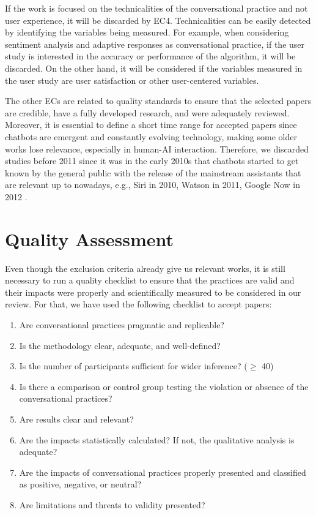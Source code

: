If the work is focused on the technicalities of the conversational practice and not user experience, it will be discarded by EC4. Technicalities can be easily detected by identifying the variables being measured. For example, when considering sentiment analysis and adaptive responses as conversational practice, if the user study is interested in the accuracy or performance of the algorithm, it will be discarded. On the other hand, it will be considered if the variables measured in the user study are user satisfaction or other user-centered variables.

The other ECs are related to quality standards to ensure that the selected papers are credible, have a fully developed research, and were adequately reviewed. Moreover, it is essential to define a short time range for accepted papers since chatbots are emergent and constantly evolving technology, making some older works lose relevance, especially in human-AI interaction. Therefore, we discarded studies before 2011 since it was in the early 2010s that chatbots started to get known by the general public \cite{rapp2021} with the release of the mainstream assistants that are relevant up to nowadays, e.g., Siri in 2010, Watson in 2011, Google Now in 2012 \cite{ADAMOPOULOU2020100006}.

\section{Quality Assessment}

Even though the exclusion criteria already give us relevant works, it is still necessary to run a quality checklist to ensure that the practices are valid and their impacts were properly and scientifically measured to be considered in our review. For that, we have used the following checklist to accept papers:

\begin{enumerate}
    \item[(QA1)] Are conversational practices pragmatic and replicable? 
    \item[(QA2)] Is the methodology clear, adequate, and well-defined?
    \item[(QA3)] Is the number of participants sufficient for wider inference? ($\geq$ 40)
    \item[(QA4)] Is there a comparison or control group testing the violation or absence of the conversational practices?  
    \item[(QA5)] Are results clear and relevant?
    \item[(QA6)] Are the impacts statistically calculated? If not, the qualitative analysis is adequate?
    \item[(QA7)] Are the impacts of conversational practices properly presented and classified as positive, negative, or neutral?
    \item[(QA8)] Are limitations and threats to validity presented?
\end{enumerate}

